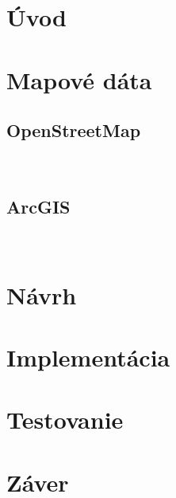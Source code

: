 

\chapter{Úvod}


\blindtext[3]

\chapter{Mapové dáta} 
\label{map-data}

\section{OpenStreetMap}
~\cite{openstreet}~\cite{bennett2010openstreetmap}
\Blindtext

\section{ArcGIS}
~\cite{arcgis}
\blindtext[4]


\chapter{Návrh}
\label{navrh}
\blindtext[2]

\Blindtext


\chapter{Implementácia}
\label{implementacia}

\blindtext[13]


\chapter{Testovanie}
\label{testovanie}

\blindtext[1]

\blindtext[10]



\chapter{Záver}
\label{zaver}

\blindtext[3]
